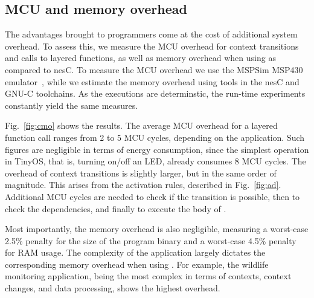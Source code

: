 
\subsection{MCU and memory overhead}\label{sec:overhead}

The advantages brought to programmers come at the cost of additional
system overhead. To assess this, we measure the MCU overhead for
context transitions and calls to layered functions, as well as memory
overhead when using \conesc as compared to nesC. To measure the MCU
overhead we use the MSPSim MSP430 emulator~\cite{eriksson09}, while we
estimate the memory overhead using tools in the nesC and GNU-C
toolchains. As the executions are determinstic, the run-time experiments
constantly yield the same measures.


 Fig.~\ref{fig:cmo} shows the results. The average
MCU overhead for a layered function call ranges from 2 to 5 MCU
cycles, depending on the application. Such figures are negligible in
terms of energy consumption, since the simplest operation in TinyOS,
that is, turning on/off an LED, already consumes 8 MCU cycles. The
overhead of context transitions is slightly larger, but in the same
order of magnitude. This arises from the activation rules, described in
Fig.~\ref{fig:ad}. Additional MCU cycles are needed to check if the transition is
possible, then to check the dependencies, and finally to execute the
body of . %

Most importantly, the memory overhead is also negligible, measuring a
worst-case 2.5\% penalty for the size of the program binary and a
worst-case 4.5\% penalty for RAM usage. The complexity of the
application largely dictates the corresponding memory overhead when
using \conesc. For example, the wildlife monitoring application,
being the most complex in terms of contexts, context changes, and data
processing, shows the highest overhead.




